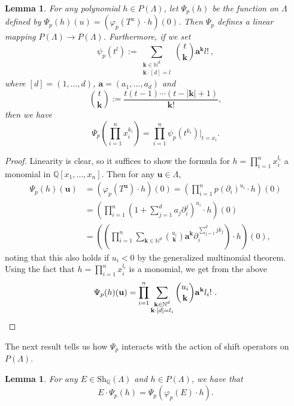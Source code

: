 \documentclass[oneside]{amsart}
\theoremstyle{plain}
\newtheorem{lemma}[theorem]{Lemma}
\theoremstyle{definition}
\newcommand{\N}{{\mathbb{N}}}
\newcommand{\Q}{{\mathbb{Q}}}
\newcommand{\Sh}{{\mathrm{Sh}}}
\renewcommand{\vec}[1]{\ensuremath{\mathbf{#1}}}
\begin{document}
\begin{lemma}\label{prop:psi-formula}
    For any polynomial $h \in P(\Lambda)$, let
    $\Psi_p(h)$ be the function on $\Lambda$ defined by
    $\Psi_p(h)(u) = (\varphi_p(T^u) \cdot h) (0)$.
    Then $\Psi_p$ defines a linear mapping $P(\Lambda) \to P(\Lambda)$. Furthermore,
    if we set
    \begin{equation*}
    \psi_p(t^l) := \sum_{\substack{\mathbf{k} \in \N^d\\ \mathbf{k} \cdot [d] = l}} \binom{t}{\mathbf{k}} \mathbf{a}^\mathbf{k}l!\ ,
    \end{equation*}
    where $[d] = (1, \dots, d)$, $\vec a = (a_1, \dots, a_d)$ and
    \[
    \binom{t}{\vec k} := \frac{t(t - 1) \cdots (t - |\mathbf{k}| + 1)}{\mathbf{k}!},
    \]
    then we have
    \[
        \Psi_p\left(\prod_{i = 1}^n x_i^{k_i}\right) = \prod_{i= 1}^n \psi_p(t^{k_i})|_{t = x_i}.
    \]
\end{lemma}

\begin{proof}
    Linearity is clear, so it suffices to show the formula for $h = \prod_{i = 1}^n x_i^{l_i}$ a monomial in $\Q[x_1, \dots, x_n]$.
    Then for any $\vec u \in \Lambda$,
\begin{align*}
    \Psi_p(h)(\vec u) &= (\varphi_p(T^{\vec u}) \cdot h) (0) = \left(\prod_{i = 1}^n p(\partial_i)^{u_i}\cdot h\right)(0)\\
    &= \left(\prod_{i = 1}^n \left(1 + \sum_{j = 1}^d a_j \partial_i^j\right)^{u_i} \cdot h\right)(0)\\
    &= \left(\left(\prod_{i = 1}^n\sum_{\mathbf{k} \in \N^d} 
    \binom{u_i}{\mathbf{k}}\mathbf{a}^\mathbf{k}\partial_i^{\sum_{j = 1}^d j k_j}\right) \cdot h\right)(0),
\end{align*}
noting that this also holds if $u_i < 0$ by the generalized multinomial theorem.
Using the fact that $h = \prod_{i = 1}^n x_i^{l_i}$ is a monomial, we get from the above
\begin{equation*}
\Psi_p(h)(\vec u)
= \prod_{i = 1}^n
\sum_{\substack{\mathbf{k} \in \N^d\\ \mathbf{k} \cdot [d] = l_i}} \binom{u_i}{\mathbf{k}} \mathbf{a}^\mathbf{k}l_i!\ .\qedhere
\end{equation*}
\end{proof}

The next result tells us how $\Psi_p$ interacts with the action of shift operators on $P(\Lambda)$.

\begin{lemma}\label{lem:Psi-shift}
    For any $E \in \Sh_\Q(\Lambda)$ and $h \in P(\Lambda)$, we have that
    \[
        E \cdot \Psi_p(h) = \Psi_p(\varphi_p(E) \cdot h).
    \]
\end{lemma}
\end{document}
